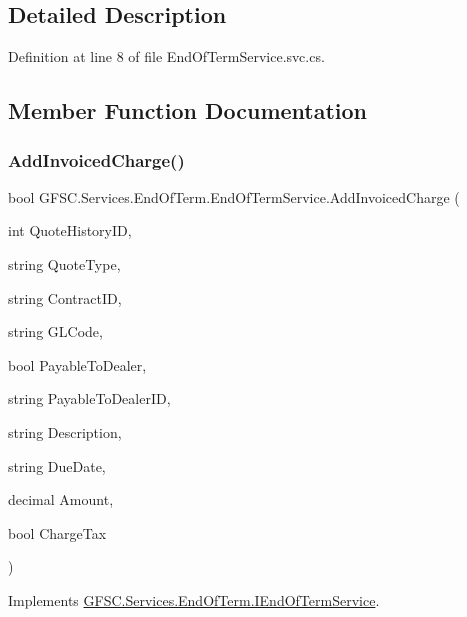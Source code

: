 \subsection{Detailed Description}


Definition at line 8 of file End\+Of\+Term\+Service.\+svc.\+cs.



\subsection{Member Function Documentation}
\mbox{\label{class_g_f_s_c_1_1_services_1_1_end_of_term_1_1_end_of_term_service_a0fa838b19293a8dfdfe4a447088c3420}} 
\subsubsection{\texorpdfstring{Add\+Invoiced\+Charge()}{AddInvoicedCharge()}}
{\footnotesize\ttfamily bool G\+F\+S\+C.\+Services.\+End\+Of\+Term.\+End\+Of\+Term\+Service.\+Add\+Invoiced\+Charge (\begin{DoxyParamCaption}\item[{int}]{Quote\+History\+ID,  }\item[{string}]{Quote\+Type,  }\item[{string}]{Contract\+ID,  }\item[{string}]{G\+L\+Code,  }\item[{bool}]{Payable\+To\+Dealer,  }\item[{string}]{Payable\+To\+Dealer\+ID,  }\item[{string}]{Description,  }\item[{string}]{Due\+Date,  }\item[{decimal}]{Amount,  }\item[{bool}]{Charge\+Tax }\end{DoxyParamCaption})}



Implements \mbox{\hyperlink{interface_g_f_s_c_1_1_services_1_1_end_of_term_1_1_i_end_of_term_service_ad9dcc5514a7bad9a4ba308d1cf72e554}{G\+F\+S\+C.\+Services.\+End\+Of\+Term.\+I\+End\+Of\+Term\+Service}}.



